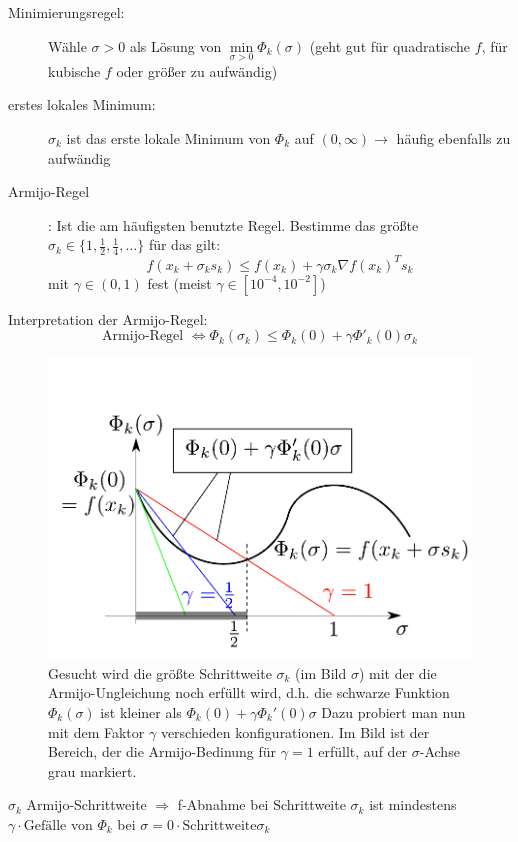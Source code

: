 \documentclass[10pt,a4paper]{article}
\begin{document}
\begin{description}
\item[Minimierungsregel:] Wähle $\sigma>0$ als Lösung von $\min\limits_{\sigma>0} \Phi_k(\sigma)$ (geht gut für quadratische $f$, für kubische $f$ oder größer zu aufwändig)
\item[erstes lokales Minimum:] $\sigma_k$ ist das erste lokale Minimum von $\Phi_k$ auf $(0,\infty) \rightarrow$ häufig ebenfalls zu aufwändig
\item[Armijo-Regel]: Ist die am häufigsten benutzte Regel. Bestimme das größte $\sigma_k \in \{ 1, \frac{1}{2}, \frac{1}{4}, \ldots \}$ für das gilt: $$f(x_k+\sigma_k s_k) \leq f(x_k) + \gamma \sigma_k \nabla f(x_k)^{T}s_k$$ mit $\gamma \in (0,1)$ fest (meist $\gamma \in [10^{-4},10^{-2}]$)
\end{description}


Interpretation der Armijo-Regel: $$ \text{Armijo-Regel } \Leftrightarrow \Phi_k(\sigma_k) \leq \Phi_k(0) + \gamma \Phi'_k(0)\sigma_k$$

\begin{figure}[H]
\includegraphics[width=\textwidth]{images/armijo}
\caption{Gesucht wird die größte Schrittweite $\sigma_k$ (im Bild $\sigma$) mit der die Armijo-Ungleichung noch erfüllt wird, d.h. die schwarze Funktion $\Phi_k(\sigma)$ ist kleiner als $\Phi_k(0)+\gamma \Phi_k'(0)\sigma$ Dazu probiert man nun mit dem Faktor $\gamma$ verschieden konfigurationen. Im Bild ist der Bereich, der die Armijo-Bedinung für $\gamma=1$ erfüllt, auf der $\sigma$-Achse grau markiert.}
\end{figure}

$\sigma_k$ Armijo-Schrittweite $\Rightarrow$ f-Abnahme bei Schrittweite $\sigma_k$ ist mindestens $\gamma \cdot \text{Gefälle}$ von $\Phi_k$ bei $\sigma=0 \cdot \text{Schrittweite} \sigma_k$
\end{document}
